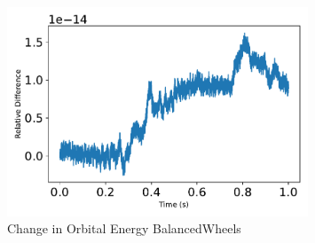 \begin{figure}[htbp]\centerline{\includegraphics[width=0.8\textwidth]{AutoTeX/ChangeInOrbitalEnergyBalancedWheels}}\caption{Change in Orbital Energy BalancedWheels}\label{fig:ChangeInOrbitalEnergyBalancedWheels}\end{figure}